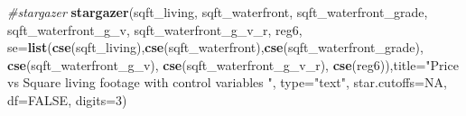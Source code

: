 \documentclass[
]{article}
\newenvironment{Shaded}{\begin{snugshade}}{\end{snugshade}}
\newcommand{\CommentTok}[1]{\textcolor[rgb]{0.56,0.35,0.01}{\textit{#1}}}
\newcommand{\DataTypeTok}[1]{\textcolor[rgb]{0.13,0.29,0.53}{#1}}
\newcommand{\DecValTok}[1]{\textcolor[rgb]{0.00,0.00,0.81}{#1}}
\newcommand{\KeywordTok}[1]{\textcolor[rgb]{0.13,0.29,0.53}{\textbf{#1}}}
\newcommand{\NormalTok}[1]{#1}
\newcommand{\OtherTok}[1]{\textcolor[rgb]{0.56,0.35,0.01}{#1}}
\newcommand{\StringTok}[1]{\textcolor[rgb]{0.31,0.60,0.02}{#1}}
\begin{document}
\begin{Shaded}
\begin{Highlighting}[]
\CommentTok{#stargazer}
\KeywordTok{stargazer}\NormalTok{(sqft_living, sqft_waterfront, sqft_waterfront_grade, sqft_waterfront_g_v, sqft_waterfront_g_v_r, reg6, }\DataTypeTok{se=}\KeywordTok{list}\NormalTok{(}\KeywordTok{cse}\NormalTok{(sqft_living),}\KeywordTok{cse}\NormalTok{(sqft_waterfront),}\KeywordTok{cse}\NormalTok{(sqft_waterfront_grade), }\KeywordTok{cse}\NormalTok{(sqft_waterfront_g_v), }\KeywordTok{cse}\NormalTok{(sqft_waterfront_g_v_r), }\KeywordTok{cse}\NormalTok{(reg6)),}\DataTypeTok{title=}\StringTok{"Price vs Square living footage with control variables "}\NormalTok{, }\DataTypeTok{type=}\StringTok{"text"}\NormalTok{, }\DataTypeTok{star.cutoffs=}\OtherTok{NA}\NormalTok{, }\DataTypeTok{df=}\OtherTok{FALSE}\NormalTok{, }\DataTypeTok{digits=}\DecValTok{3}\NormalTok{)}
\end{Highlighting}
\end{Shaded}
\end{document}
